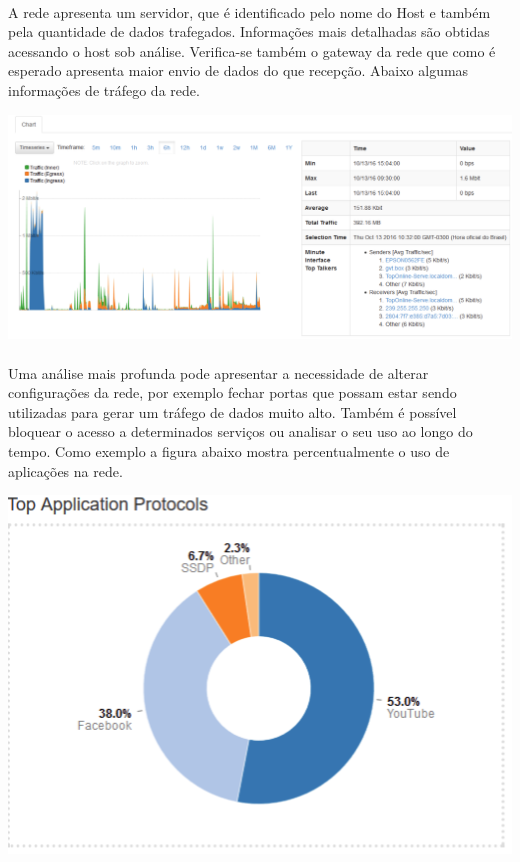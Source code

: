 \documentclass[a4paper]{article}
\begin{document}
\paragraph{}A rede apresenta um servidor, que é identificado pelo nome do Host e também pela quantidade de dados trafegados. Informações mais detalhadas são obtidas acessando o host sob análise. Verifica-se também o gateway da rede que como é esperado apresenta maior envio de dados do que recepção. Abaixo algumas informações de tráfego da rede.


\includegraphics[scale = 0.35]{ntop2.png}

\paragraph{}Uma análise mais profunda pode apresentar a necessidade de alterar configurações da rede, por exemplo fechar portas que possam estar sendo utilizadas para gerar um tráfego de dados muito alto. Também é possível bloquear o acesso a determinados serviços ou analisar o seu uso ao longo do tempo. Como exemplo a figura abaixo mostra percentualmente o uso de aplicações na rede.

 \includegraphics[scale = 0.35]{ntop3.png}
    
\end{document}
